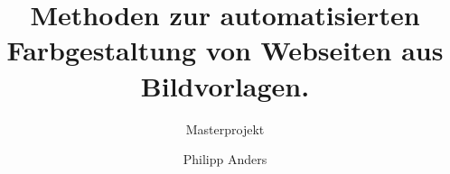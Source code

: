 \documentclass[11pt, bibliography=totoc]{scrartcl}
\begin{document}
\title{Methoden zur automatisierten Farbgestaltung von Webseiten aus Bildvorlagen.}
\subtitle{Masterprojekt}
\author{Philipp Anders}

\maketitle

\begin{abstract}
\end{abstract}

\pagebreak
\tableofcontents
\pagebreak













\footnotesize{}
\end{document}
